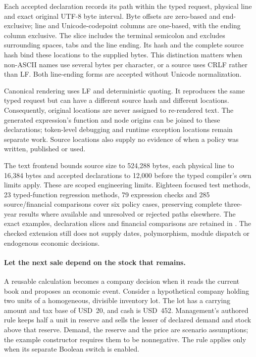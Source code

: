 Each accepted declaration records its path within the typed request, physical
line and exact original UTF-8 byte interval. Byte offsets are zero-based and
end-exclusive; line and Unicode-codepoint columns are one-based, with the ending
column exclusive. The slice includes the terminal semicolon and excludes
surrounding spaces, tabs and the line ending. Its hash and the complete source
hash bind these locations to the supplied bytes. This distinction matters when
non-ASCII names use several bytes per character, or a source uses CRLF rather
than LF. Both line-ending forms are accepted without Unicode normalization.

Canonical rendering uses LF and deterministic quoting. It reproduces the same
typed request but can have a different source hash and different locations.
Consequently, original locations are never assigned to re-rendered text.
The generated expression's function and node origins can be joined to these
declarations; token-level debugging and runtime exception locations remain
separate work. Source locations also supply no evidence of when a policy was
written, published or used.

The text frontend bounds source size to 524,288 bytes, each physical line to
16,384 bytes and accepted declarations to 12,000 before the typed compiler's
own limits apply. These are scoped engineering limits. Eighteen focused test
methods, 23 typed-function regression methods, 79 expression checks and 285
source/financial comparisons cover six policy cases, preserving complete
three-year results where available and unresolved or rejected paths elsewhere.
The exact examples, declaration slices and financial comparisons are retained
in . The checked
extension still does not supply dates, polymorphism, module dispatch or
endogenous economic decisions.


\paragraph{Let the next sale depend on the stock that remains.}
A reusable calculation becomes a company decision when it reads the current
book and proposes an economic event. Consider a hypothetical company holding
two units of a homogeneous, divisible inventory lot. The lot has a carrying
amount and tax base of USD~20, and cash is USD~452. Management's authored rule
keeps half a unit in reserve and sells the lesser of declared demand and stock
above that reserve. Demand, the reserve and the price are scenario assumptions;
the example constructor requires them to be nonnegative. The rule applies only
when its separate Boolean switch is enabled.

